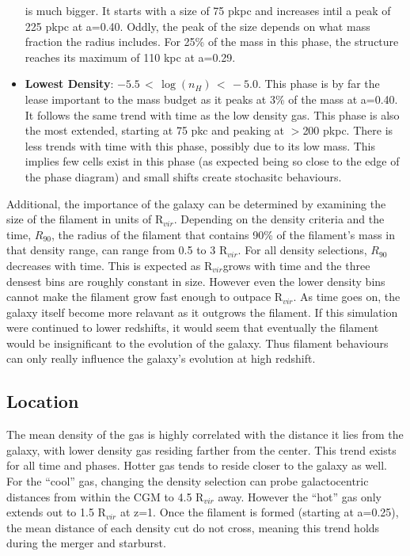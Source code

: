 \documentclass{article}
\newcommand{\rvir}{R$_{vir}$}
\begin{document}
\begin{itemize}
is much bigger. It starts with a size of 75 pkpc and increases intil a peak of
225 pkpc at a=0.40. Oddly, the peak of the size depends on what mass fraction the
radius includes. For 25\% of the mass in this phase, the structure reaches its
maximum of 110 kpc at a=0.29. 
\item {\bf Lowest Density}: $-5.5\,<\,\log(n_H)\,<\,-5.0$. This phase is by far
the lease important to the mass budget as it peaks at 3\% of the mass at a=0.40.
It follows the same trend with time as the low density gas. This phase is also
the most extended, starting at 75 pkc and peaking at $>$200 pkpc. There is less
trends with time with this phase, possibly due to its low mass. This implies few
cells exist in this phase (as expected being so close to the edge of the phase
diagram) and small shifts create stochasitc behaviours. 
\end{itemize}

Additional, the importance of the galaxy can be determined by examining the size
of the filament in units of R$_{vir}$. Depending on the density criteria and the
time, $R_{90}$, the radius of the filament that contains 90\% of the filament's
mass in that density range, can range from 0.5 to 3 \rvir.  For all density
selections, $R_{90}$ decreases with time. This is expected as \rvir grows with
time and the three densest bins are roughly constant in size. However even the
lower density bins cannot make the filament grow fast enough to outpace \rvir. As
time goes on, the galaxy itself become more relavant as it outgrows the filament.
If this simulation were continued to lower redshifts, it would seem that
eventually the filament would be insignificant to the evolution of the galaxy.
Thus filament behaviours can only really influence the galaxy's evolution at high
redshift. 


\subsection{Location}
The mean density of the gas is highly correlated with the distance it lies from
the galaxy, with lower density gas residing farther from the center. This trend
exists for all time and phases. Hotter gas tends to reside closer to the galaxy
as well. For the ``cool'' gas, changing the density selection can probe
galactocentric distances from within the CGM to 4.5 R$_{vir}$ away. However the
``hot'' gas only extends out to 1.5 R$_{vir}$ at z=1. Once the filament is formed
(starting at a=0.25), the mean distance of each density cut do not cross, meaning
this trend holds during the merger and starburst. 
\end{document}

